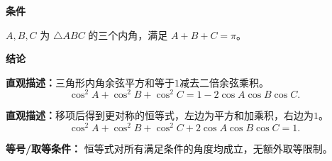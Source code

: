 \begin{statementbox}

\textbf{\textcolor{CStatement}{条件}}
\begin{description}[style=nextline, leftmargin=2.8em, labelsep=0.5em, itemsep=0.35em]
    \item[\textbf{\textcolor{CStatement}{条件 1（内角和为π）：}}] $A,B,C$ 为 $\triangle ABC$ 的三个内角，满足 $A+B+C=\pi$。
\end{description}

\textbf{\textcolor{CStatement}{结论}}
\begin{description}[style=nextline, leftmargin=2.8em, labelsep=0.5em, itemsep=0.45em]
    \item[\textbf{\textcolor{CStatement}{结论一（余弦平方和）：}}]
    \textbf{\textcolor{CStatement}{直观描述：}}三角形内角余弦平方和等于$1$减去二倍余弦乘积。
    \[
    \cos^2 A+\cos^2 B+\cos^2 C = 1-2\cos A\cos B\cos C.
    \]

    \item[\textbf{\textcolor{CStatement}{推广结论（等价形式）：}}]
    \textbf{\textcolor{CStatement}{直观描述：}}移项后得到更对称的恒等式，左边为平方和加乘积，右边为$1$。
    \[
    \cos^2 A+\cos^2 B+\cos^2 C+2\cos A\cos B\cos C = 1.
    \]
\end{description}

\textbf{\textcolor{CStatement}{等号/取等条件：}} 恒等式对所有满足条件的角度均成立，无额外取等限制。

\end{statementbox}
